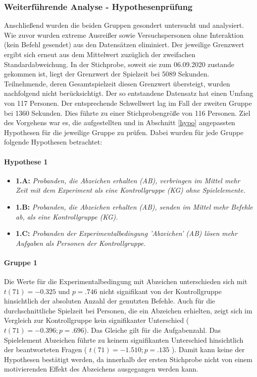 \subsubsection{Weiterführende Analyse - Hypothesenprüfung}


Anschließend wurden die beiden Gruppen gesondert untersucht und analysiert. Wie zuvor wurden extreme Ausreißer sowie Versuchspersonen ohne Interaktion (kein Befehl gesendet) aus den Datensätzen eliminiert. Der jeweilige Grenzwert ergibt sich erneut aus dem Mittelwert zuzüglich der zweifachen Standardabweichung. In der Stichprobe, soweit sie zum 06.09.2020 zustande gekommen ist, liegt der Grenzwert der Spielzeit bei 5089 Sekunden. Teilnehmende, deren Gesamtspielzeit diesen Grenzwert übersteigt, wurden nachfolgend nicht berücksichtigt. Der so entstandene Datensatz hat einen Umfang von 117 Personen. Der entsprechende Schwellwert lag im Fall der zweiten Gruppe bei 1360 Sekunden. Dies führte zu einer Stichprobengröße von 116 Personen. Ziel des Vorgehens war es, die aufgestellten und in Abschnitt \ref{hypo} angepassten Hypothesen für die jeweilige Gruppe zu prüfen. Dabei wurden für jede Gruppe folgende Hypothesen betrachtet:

\paragraph{Hypothese 1}
\begin{itemize}
    \item \textbf{1.A:} \textit{Probanden, die Abzeichen erhalten (AB), verbringen im Mittel mehr Zeit mit dem Experiment als eine Kontrollgruppe (KG) ohne Spielelemente.}
    \item \textbf{1.B:} \textit{Probanden, die Abzeichen erhalten (AB), senden im Mittel mehr Befehle ab, als eine Kontrollgruppe (KG).}
    \item \textbf{1.C:} \textit{Probanden der Experimentalbedingung 'Abzeichen' (AB) lösen mehr Aufgaben als Personen der Kontrollgruppe.} 
\end{itemize}

\paragraph{Gruppe 1}
Die Werte für die Experimentalbedingung mit Abzeichen unterschieden sich mit $ t(71)=-0.325 $ und $p=.746$ nicht signifikant von der Kontrollgruppe hinsichtlich der absoluten Anzahl der genutzten Befehle. Auch für die durchschnittliche Spielzeit bei Personen, die ein Abzeichen erhielten, zeigt sich im Vergleich zur Kontrollgruppe kein signifikanter Unterschied ($t(71)=-0.396; p=.696$). Das Gleiche gilt für die Aufgabenzahl. Das Spielelement Abzeichen führte zu keinem signifikanten Unterschied hinsichtlich der beantworteten Fragen ( $ t(71)=-1.510; p=.135 $ ). Damit kann keine der Hypothesen bestätigt werden, da innerhalb der ersten Stichprobe nicht von einem motivierenden Effekt des Abzeichens ausgegangen werden kann.

